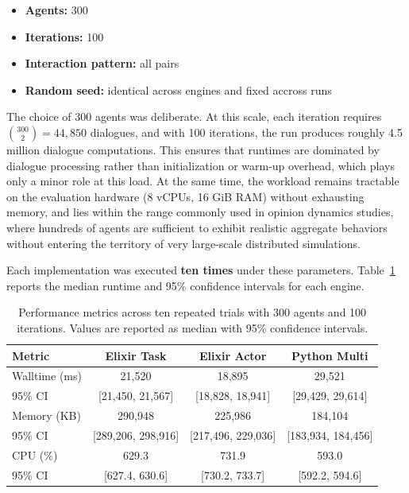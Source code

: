 \documentclass[
]{ceurart}
\begin{document}
\begin{itemize}
	\item \textbf{Agents:} 300
	\item \textbf{Iterations:} 100
	\item \textbf{Interaction pattern:} all pairs
	\item \textbf{Random seed:} identical across engines and fixed accross runs
\end{itemize}

The choice of 300 agents was deliberate. At this scale, each iteration requires $\binom{300}{2} = 44{,}850$ dialogues, and with 100 iterations, the run produces roughly 4.5 million dialogue computations. This ensures that runtimes are dominated by dialogue processing rather than initialization or warm-up overhead, which plays only a minor role at this load. At the same time, the workload remains tractable on the evaluation hardware (8 vCPUs, 16 GiB RAM) without exhausting memory, and lies within the range commonly used in opinion dynamics studies, where hundreds of agents are sufficient to exhibit realistic aggregate behaviors without entering the territory of very large-scale distributed simulations.


Each implementation was executed \textbf{ten times} under these parameters. Table~\ref{tab:runtime_trials} reports the median runtime and 95\% confidence intervals for each engine.

\begin{table}[ht]
\centering
\caption{Performance metrics across ten repeated trials with 300 agents and 100 iterations.
Values are reported as median with 95\% confidence intervals.}\label{tab:runtime_trials}
\begin{tabular}{lccc}
\toprule
Metric & Elixir Task & Elixir Actor & Python Multi \\
\midrule
Walltime (ms) & 21,520 & 18,895 & 29,521 \\
95\% CI & [21,450, 21,567] & [18,828, 18,941] & [29,429, 29,614] \\
Memory (KB) & 290,948 & 225,986 & 184,104 \\
95\% CI & [289,206, 298,916] & [217,496, 229,036] & [183,934, 184,456] \\
CPU (\%) & 629.3 & 731.9 & 593.0 \\
95\% CI & [627.4, 630.6] & [730.2, 733.7] & [592.2, 594.6] \\
\bottomrule
\end{tabular}
\end{table}
\end{document}

